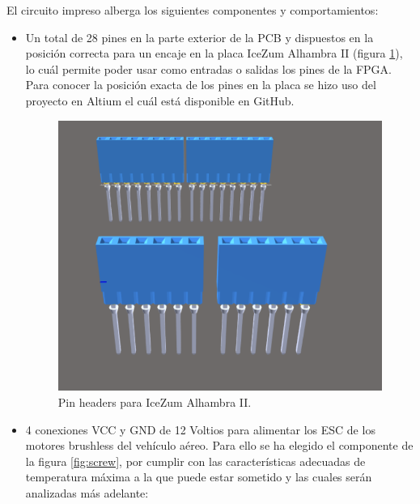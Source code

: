 El circuito impreso alberga los siguientes componentes y
comportamientos:

\begin{itemize}
	\item Un total de 28 pines en la parte exterior de la PCB y dispuestos en la posición correcta para un encaje en la placa IceZum Alhambra II (figura \ref{fig:pin_headers}), lo cuál permite poder usar como entradas o salidas los pines de la FPGA. Para conocer la posición exacta de los pines en la placa se hizo uso del proyecto en Altium el cuál está disponible en GitHub.
	
	\begin{figure}[H]
		\center
		\includegraphics[scale=0.5]{imagenes/Balancing_robot/pin_headers.PNG}
		\caption{Pin headers para IceZum Alhambra II.}
		\label{fig:pin_headers}
	\end{figure}
	
	
	\item 4 conexiones VCC y GND de 12 Voltios para alimentar los ESC de los motores brushless del vehículo aéreo. Para ello se ha elegido el componente de la figura \ref{fig:screw}, por cumplir con las características adecuadas de temperatura máxima a la que puede estar sometido y las cuales serán analizadas más adelante: 
	

\end{itemize}
